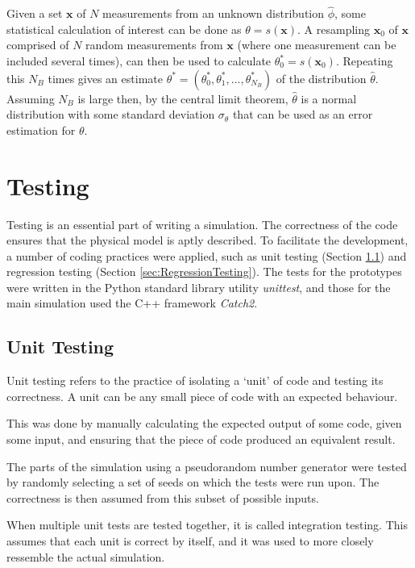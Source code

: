 Given a set $\bm x$ of $N$ measurements from an unknown distribution $\hat \phi$, some statistical calculation of interest can be done as $\theta = s(\bm x)$. A resampling $\bm x_0$ of $\bm x$ comprised of $N$ random measurements from $\bm x$ (where one measurement can be included several times), can then be used to calculate $\theta^*_0 = s(\bm x_0)$. Repeating this $N_B$ times gives an estimate $\theta^* = (\theta^*_0, \theta^*_1, ..., \theta^*_{N_B})$ of the distribution $\hat \theta$. Assuming $N_B$ is large then, by the central limit theorem, $\hat \theta$ is a normal distribution with some standard deviation $\sigma_\theta$ that can be used as an error estimation for $\theta$.

\section{Testing}
\label{sec:Testing}

Testing is an essential part of writing a simulation. The correctness of the code ensures that the physical model is aptly described. To facilitate the development, a number of coding practices were applied, such as unit testing (Section \ref{sec:UnitTesting}) and regression testing (Section \ref{sec:RegressionTesting}). The tests for the prototypes were written in the Python standard library utility \textit{unittest}, and those for the main simulation used the C++ framework \textit{Catch2}.

\subsection{Unit Testing}
\label{sec:UnitTesting}

Unit testing refers to the practice of isolating a `unit' of code and testing its correctness. A unit can be any small piece of code with an expected behaviour.

This was done by manually calculating the expected output of some code, given some input, and ensuring that the piece of code produced an equivalent result.

The parts of the simulation using a pseudorandom number generator were tested by randomly selecting a set of seeds on which the tests were run upon. The correctness is then assumed from this subset of possible inputs.

When multiple unit tests are tested together, it is called integration testing. This assumes that each unit is correct by itself, and it was used to more closely ressemble the actual simulation.

